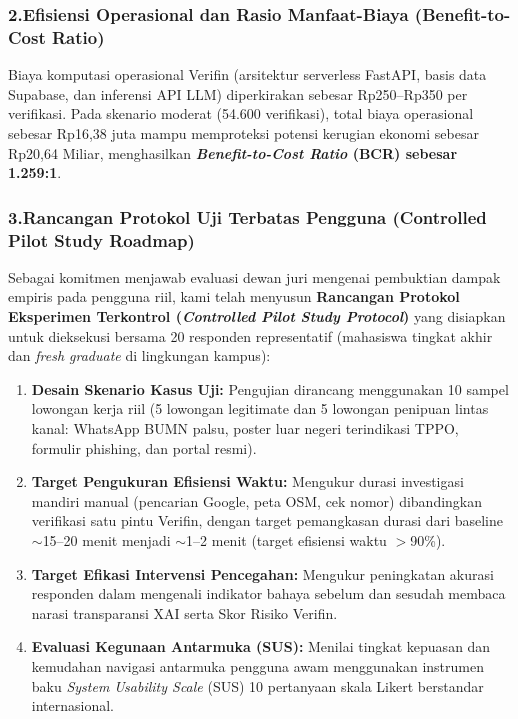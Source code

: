 \documentclass[12pt,a4paper]{article}
\begin{document}
\begin{blokkuning}
\subsubsection*{2.\quad Efisiensi Operasional dan Rasio Manfaat-Biaya (Benefit-to-Cost Ratio)}
Biaya komputasi operasional Verifin (arsitektur serverless FastAPI, basis data Supabase, dan inferensi
API LLM) diperkirakan sebesar Rp250--Rp350 per verifikasi. Pada skenario moderat (54.600 verifikasi), total biaya
operasional sebesar Rp16,38 juta mampu memproteksi potensi kerugian ekonomi sebesar Rp20,64 Miliar,
menghasilkan \textbf{\textit{Benefit-to-Cost Ratio} (BCR) sebesar 1.259:1}.

\subsubsection*{3.\quad Rancangan Protokol Uji Terbatas Pengguna (Controlled Pilot Study Roadmap)}
Sebagai komitmen menjawab evaluasi dewan juri mengenai pembuktian dampak empiris pada pengguna riil, kami telah menyusun \textbf{Rancangan Protokol Eksperimen Terkontrol (\textit{Controlled Pilot Study Protocol})} yang disiapkan untuk dieksekusi bersama 20 responden representatif (mahasiswa tingkat akhir dan \textit{fresh graduate} di lingkungan kampus):
\begin{enumerate}[label=\textbf{\alph*.}]
\item \textbf{Desain Skenario Kasus Uji:} Pengujian dirancang menggunakan 10 sampel lowongan kerja riil (5 lowongan legitimate dan 5 lowongan penipuan lintas kanal: WhatsApp BUMN palsu, poster luar negeri terindikasi TPPO, formulir phishing, dan portal resmi).
\item \textbf{Target Pengukuran Efisiensi Waktu:} Mengukur durasi investigasi mandiri manual (pencarian Google, peta OSM, cek nomor) dibandingkan verifikasi satu pintu Verifin, dengan target pemangkasan durasi dari baseline $\sim$15--20 menit menjadi $\sim$1--2 menit (target efisiensi waktu $>$90\%).
\item \textbf{Target Efikasi Intervensi Pencegahan:} Mengukur peningkatan akurasi responden dalam mengenali indikator bahaya sebelum dan sesudah membaca narasi transparansi XAI serta Skor Risiko Verifin.
\item \textbf{Evaluasi Kegunaan Antarmuka (SUS):} Menilai tingkat kepuasan dan kemudahan navigasi antarmuka pengguna awam menggunakan instrumen baku \textit{System Usability Scale} (SUS) 10 pertanyaan skala Likert berstandar internasional.
\end{enumerate}


\end{blokkuning}
\end{document}
